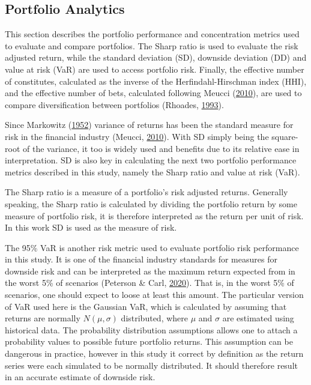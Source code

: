 \documentclass[11pt,preprint, authoryear]{elsarticle}
\numberwithin{equation}{section}
\numberwithin{figure}{section}
\numberwithin{table}{section}
\begin{document}
\hypertarget{portfolio-analytics}{%
\subsection{\texorpdfstring{Portfolio Analytics
\label{portmet}}{Portfolio Analytics }}\label{portfolio-analytics}}

This section describes the portfolio performance and concentration
metrics used to evaluate and compare portfolios. The Sharp ratio is used
to evaluate the risk adjusted return, while the standard deviation (SD),
downside deviation (DD) and value at risk (VaR) are used to access
portfolio risk. Finally, the effective number of constitutes, calculated
as the inverse of the Herfindahl-Hirschman index (HHI), and the
effective number of bets, calculated following Meucci
(\protect\hyperlink{ref-meucci2010}{2010}), are used to compare
diversification between portfolios (Rhoades,
\protect\hyperlink{ref-rhoades1993}{1993}).

Since Markowitz (\protect\hyperlink{ref-markowitz}{1952}) variance of
returns has been the standard measure for risk in the financial industry
(Meucci, \protect\hyperlink{ref-meucci2010}{2010}). With SD simply being
the square-root of the variance, it too is widely used and benefits due
to its relative ease in interpretation. SD is also key in calculating
the next two portfolio performance metrics described in this study,
namely the Sharp ratio and value at risk (VaR).

The Sharp ratio is a measure of a portfolio's risk adjusted returns.
Generally speaking, the Sharp ratio is calculated by dividing the
portfolio return by some measure of portfolio risk, it is therefore
interpreted as the return per unit of risk. In this work SD is used as
the measure of risk.

The 95\% VaR is another risk metric used to evaluate portfolio risk
performance in this study. It is one of the financial industry standards
for measures for downside risk and can be interpreted as the maximum
return expected from in the worst 5\% of scenarios (Peterson \& Carl,
\protect\hyperlink{ref-PerformanceAnalytics}{2020}). That is, in the
worst 5\% of scenarios, one should expect to loose at least this amount.
The particular version of VaR used here is the Gaussian VaR, which is
calculated by assuming that returns are normally \(N(\mu,\sigma)\)
distributed, where \(\mu\) and \(\sigma\) are estimated using historical
data. The probability distribution assumptions allows one to attach a
probability values to possible future portfolio returns. This assumption
can be dangerous in practice, however in this study it correct by
definition as the return series were each simulated to be normally
distributed. It should therefore result in an accurate estimate of
downside risk.
\end{document}
